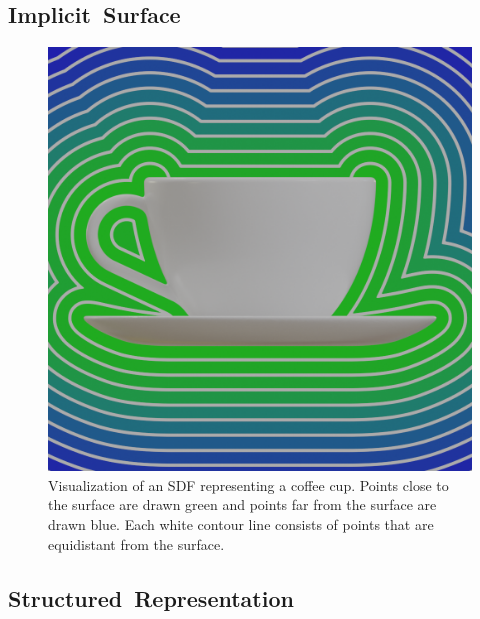 \subsection{Implicit~Surface}
\label{subsec:implicit_surface}

\begin{figure}[h]
	\centering
	\includegraphics[scale=0.2]{Images/SDF Cup}
	\caption{Visualization of an SDF representing a coffee cup. Points close to the surface are drawn green and points far from the surface are drawn blue. Each white contour line consists of points that are equidistant from the surface.}
	\label{fig:sdf_cup}
\end{figure}

\subsection{Structured~Representation}
\label{subsec:structured_representation}

